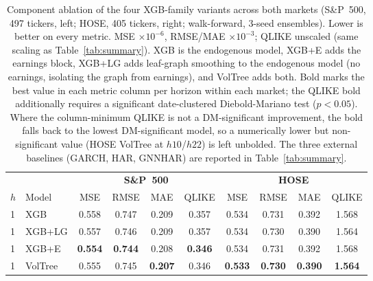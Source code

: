 \documentclass[runningheads]{llncs}
\begin{document}
\begin{table}[t]
\centering
\caption{Component ablation of the four XGB-family variants across both markets (S\&P~500, 497 tickers,
left; HOSE, 405 tickers, right; walk-forward, 3-seed ensembles). Lower is better on every metric. MSE
$\times10^{-6}$, RMSE/MAE $\times10^{-3}$; QLIKE unscaled (same scaling as Table~\ref{tab:summary}). XGB
is the endogenous model, XGB+E adds the earnings block, XGB+LG adds leaf-graph smoothing to the
endogenous model (no earnings, isolating the graph from earnings), and VolTree adds both. Bold marks the
best value in each metric column per horizon within
each market; the QLIKE bold additionally requires a significant date-clustered Diebold-Mariano test
($p<0.05$). Where the column-minimum QLIKE is not a DM-significant improvement, the bold falls back to the
lowest DM-significant model, so a numerically lower but non-significant value (HOSE VolTree at $h10$/$h22$)
is left unbolded. The three external baselines (GARCH, HAR, GNNHAR) are reported in Table~\ref{tab:summary}.}
\label{tab:detail}
\footnotesize
\setlength{\tabcolsep}{3pt}
\begin{tabular}{ll cccc cccc}
\toprule
& & \multicolumn{4}{c}{\textbf{S\&P~500}} & \multicolumn{4}{c}{\textbf{HOSE}} \\
\cmidrule(lr){3-6}\cmidrule(lr){7-10}
$h$ & Model & MSE & RMSE & MAE & QLIKE & MSE & RMSE & MAE & QLIKE \\
\midrule
1 & XGB      & 0.558 & 0.747 & 0.209 & 0.357 & 0.534 & 0.731 & 0.392 & 1.568 \\ %
1 & XGB+LG   & 0.557 & 0.746 & 0.209 & 0.357 & 0.534 & 0.730 & 0.390 & 1.564 \\ %
1 & XGB+E    & \textbf{0.554} & \textbf{0.744} & 0.208 & \textbf{0.346} & 0.534 & 0.731 & 0.392 & 1.568 \\ %
1 & VolTree & 0.555 & 0.745 & \textbf{0.207} & 0.346 & \textbf{0.533} & \textbf{0.730} & \textbf{0.390} & \textbf{1.564} \\ %

\end{tabular}
\end{table}
\end{document}
